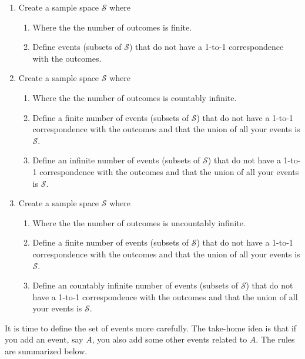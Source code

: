 \documentclass[]{book}
\providecommand{\tightlist}{%
  \setlength{\itemsep}{0pt}\setlength{\parskip}{0pt}}
\begin{document}
\begin{enumerate}
\def\labelenumi{\arabic{enumi}.}
\tightlist
\item
  Create a sample space \(\mathcal{S}\) where

  \begin{enumerate}
  \def\labelenumii{\alph{enumii})}
  \tightlist
  \item
    Where the the number of outcomes is finite.
  \item
    Define events (subsets of \(\mathcal{S}\)) that do not have a 1-to-1
    correspondence with the outcomes.
  \end{enumerate}
\item
  Create a sample space \(\mathcal{S}\) where

  \begin{enumerate}
  \def\labelenumii{\alph{enumii})}
  \tightlist
  \item
    Where the the number of outcomes is countably infinite.
  \item
    Define a finite number of events (subsets of \(\mathcal{S}\)) that
    do not have a 1-to-1 correspondence with the outcomes and that the
    union of all your events is \(\mathcal{S}\).
  \item
    Define an infinite number of events (subsets of \(\mathcal{S}\))
    that do not have a 1-to-1 correspondence with the outcomes and that
    the union of all your events is \(\mathcal{S}\).
  \end{enumerate}
\item
  Create a sample space \(\mathcal{S}\) where

  \begin{enumerate}
  \def\labelenumii{\alph{enumii})}
  \tightlist
  \item
    Where the the number of outcomes is uncountably infinite.
  \item
    Define a finite number of events (subsets of \(\mathcal{S}\)) that
    do not have a 1-to-1 correspondence with the outcomes and that the
    union of all your events is \(\mathcal{S}\).
  \item
    Define an countably infinite number of events (subsets of
    \(\mathcal{S}\)) that do not have a 1-to-1 correspondence with the
    outcomes and that the union of all your events is \(\mathcal{S}\).
  \end{enumerate}
\end{enumerate}

It is time to define the set of events more carefully. The take-home
idea is that if you add an event, say \(A\), you also add some other
events related to \(A\). The rules are summarized below.
\end{document}
